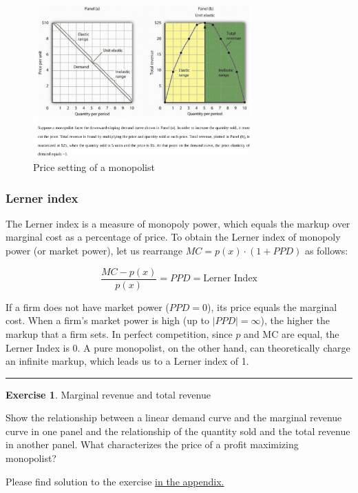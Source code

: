 \documentclass[
  12pt,
  oneside]{book}
\theoremstyle{definition}
\theoremstyle{definition}
\theoremstyle{definition}
\newtheorem{exercise}{Exercise}[chapter]
\theoremstyle{definition}
\theoremstyle{remark}
\begin{document}
\begin{figure}
\centering
\includegraphics[width=0.75\textwidth,height=\textheight]{fig/ppd.png}
\caption[\label{fig:ppd} Price setting of a monopolist]{\label{fig:ppd} Price setting of a monopolist\footnotemark{}}
\end{figure}

\subsubsection*{Lerner index}\label{lerner-index}

The Lerner index is a measure of monopoly power, which equals the markup over marginal cost as a percentage of price. To obtain the Lerner index of monopoly power (or market power), let us rearrange \(MC = p(x) \cdot \left(1 + PPD\right)\) as follows:

\[ \frac{MC - p(x)}{p(x)} = PPD = \text{Lerner Index} \]

If a firm does not have market power (\(PPD = 0\)), its price equals the marginal cost. When a firm's market power is high (up to \(|PPD| = \infty\)), the higher the markup that a firm sets. In perfect competition, since \(p\) and MC are equal, the Lerner Index is 0. A pure monopolist, on the other hand, can theoretically charge an infinite markup, which leads us to a Lerner index of 1.

\begin{center}\rule{0.5\linewidth}{0.5pt}\end{center}

\begin{exercise}
\protect\hypertarget{exr:marrevtotrev}{}\label{exr:marrevtotrev}Marginal revenue and total revenue

Show the relationship between a linear demand curve and the marginal revenue curve in one panel and the relationship of the quantity sold and the total revenue in another panel. What characterizes the price of a profit maximizing monopolist?

Please find solution to the exercise \hyperref[sol:marrevtotrev]{in the appendix.}
\end{exercise}
\end{document}
